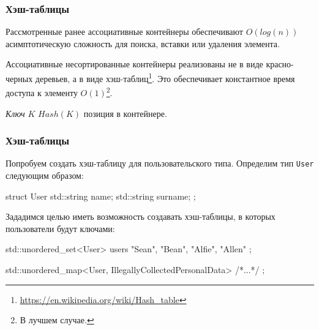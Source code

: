 \documentclass[compress, 8pt]{beamer}
\begin{document}
  \begin{frame}[fragile]

    \frametitle{Хэш-таблицы}

    Рассмотренные ранее ассоциативные контейнеры обеспечивают
    $O\left(log\left(n\right)\right)$ асимптотическую сложность
    для поиска, вставки или удаления элемента.

    \hfill \break
    Ассоциативные несортированные контейнеры реализованы не в виде
    красно-черных деревьев, а в виде
    хэш-таблиц\footnote{\url{https://en.wikipedia.org/wiki/Hash\_table}}.
    Это обеспечивает константное время доступа к элементу
    $O\left(1\right)$\footnote{В лучшем случае.}.

    \hfill \break
    \centering

    \textit{Ключ} $K$
    \rightarrow \space $Hash\left(K\right)$
    \rightarrow \space позиция в контейнере.

  \end{frame}

  \begin{frame}[fragile]

    \frametitle{Хэш-таблицы}

    Попробуем создать хэш-таблицу для пользовательского типа.
    Определим тип \texttt{User} следующим образом:

    \begin{mycppinplacelisting}
struct User {
    std::string name;
    std::string surname;
};
    \end{mycppinplacelisting}

    Зададимся целью иметь возможность создавать хэш-таблицы,
    в которых пользователи будут ключами:

    \begin{mycppinplacelisting}
std::unordered_set<User> users {
    {"Sean", "Bean"},
    {"Alfie", "Allen"}
};

std::unordered_map<User, IllegallyCollectedPersonalData> {
    /*...*/
};
    \end{mycppinplacelisting}

  \end{frame}
\end{document}
